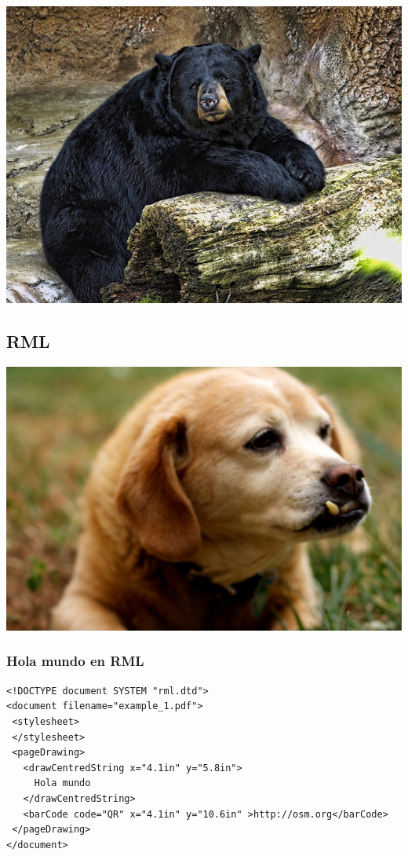 \documentclass[8pt,xcolor={usenames,dvipsnames}]{beamer}
\begin{document}
\begin{frame}

\includegraphics[height=\paperheight]{images/sleepybear.jpg}

\end{frame}

\subsection{RML}

\begin{frame}

\includegraphics[width=\paperwidth]{images/uglyxml.jpg}

\end{frame}

\begin{frame}[fragile]
\frametitle{Hola mundo en RML}
\begin{verbatim}
<!DOCTYPE document SYSTEM "rml.dtd">
<document filename="example_1.pdf">
 <stylesheet>
 </stylesheet>
 <pageDrawing>
   <drawCentredString x="4.1in" y="5.8in">
     Hola mundo
   </drawCentredString>
   <barCode code="QR" x="4.1in" y="10.6in" >http://osm.org</barCode>
 </pageDrawing>
</document>
\end{verbatim}

\end{frame}
\end{document}

